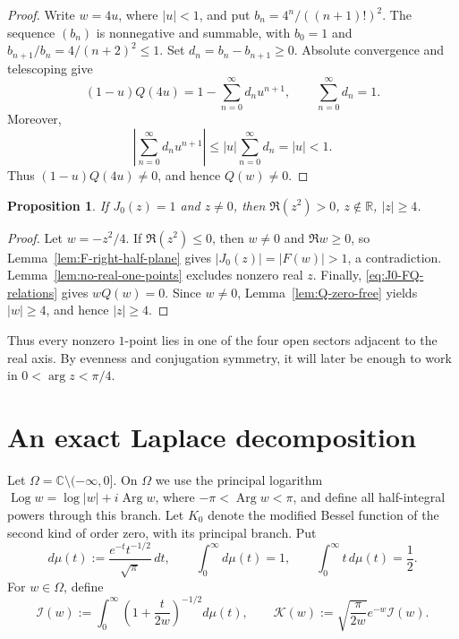 \documentclass[11pt]{amsart}
\numberwithin{equation}{section}
\DeclareMathOperator{\Log}{Log}
\DeclareMathOperator{\Arg}{Arg}
\newtheorem{proposition}[theorem]{Proposition}
\theoremstyle{definition}
\theoremstyle{remark}
\newcommand{\C}{\mathbb C}
\newcommand{\R}{\mathbb R}
\begin{document}
\begin{proof}
Write $w=4u$, where $|u|<1$, and put $b_n=4^n/((n+1)!)^2$.  The sequence
$(b_n)$ is nonnegative and summable, with $b_0=1$ and
$b_{n+1}/b_n=4/(n+2)^2\le1$.  Set $d_n=b_n-b_{n+1}\ge0$.  Absolute
convergence and telescoping give
\begin{equation}\label{eq:Q-Abel-transform}
   (1-u)Q(4u)=1-\sum_{n=0}^{\infty}d_nu^{n+1},
   \qquad
   \sum_{n=0}^{\infty}d_n=1.
\end{equation}
Moreover,
\[
   \left|\sum_{n=0}^{\infty}d_nu^{n+1}\right|
   \le |u|\sum_{n=0}^{\infty}d_n=|u|<1.
\]
Thus $(1-u)Q(4u)\ne0$, and hence $Q(w)\ne0$.
\end{proof}

\begin{proposition}\label{prop:global-localization}
If $J_0(z)=1$ and $z\ne0$, then
$
   \Re(z^2)>0$, $z\notin\R$, $|z|\ge4$.
\end{proposition}

\begin{proof}
Let $w=-z^2/4$.  If $\Re(z^2)\le0$, then $w\ne0$ and $\Re w\ge0$, so
Lemma~\ref{lem:F-right-half-plane} gives $|J_0(z)|=|F(w)|>1$, a
contradiction.  Lemma~\ref{lem:no-real-one-points} excludes nonzero real
$z$.  Finally, \eqref{eq:J0-FQ-relations} gives $wQ(w)=0$.  Since $w\ne0$,
Lemma~\ref{lem:Q-zero-free} yields $|w|\ge4$, and hence $|z|\ge4$.
\end{proof}

Thus every nonzero $1$-point lies in one of the four open sectors adjacent
to the real axis.  By evenness and conjugation symmetry, it will later be
enough to work in $0<\arg z<\pi/4$.

\section{An exact Laplace decomposition}\label{sec:laplace}

Let $\Omega=\C\setminus(-\infty,0]$.  On $\Omega$ we use the principal
logarithm $\Log w=\log|w|+i\Arg w$, where $-\pi<\Arg w<\pi$, and define all
half-integral powers through this branch.  Let $K_0$ denote the modified
Bessel function of the second kind of order zero, with its principal branch.
Put
\[
   d\mu(t):=\frac{e^{-t}t^{-1/2}}{\sqrt\pi}\,dt,
   \qquad
   \int_0^\infty d\mu(t)=1,
   \qquad
   \int_0^\infty t\,d\mu(t)=\frac12.
\]
For $w\in\Omega$, define
\[
   \mathcal I(w):=\int_0^\infty
   \left(1+\frac{t}{2w}\right)^{-1/2}d\mu(t),
   \qquad
   \mathcal K(w):=\sqrt{\frac{\pi}{2w}}e^{-w}\mathcal I(w).
\]
\end{document}
